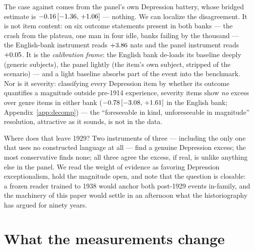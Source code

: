\documentclass[11pt]{article}
\begin{document}
The case against comes from the panel's own Depression battery, whose bridged estimate is $-0.16\,[-1.36,\,+1.06]$ ---
nothing. We can localize the disagreement. It is not item content: on six outcome statements present in both
banks --- the crash from the plateau, one man in four idle, banks failing by the thousand --- the English-bank
instrument reads $+3.86$ nats and the panel instrument reads $+0.05$. It is the
\emph{calibration frame}: the English bank de-loads its baseline deeply (generic subjects), the panel lightly
(the item's own subject, stripped of the scenario) --- and a light baseline absorbs part of the event into
the benchmark. Nor is it severity: classifying every Depression item by whether its outcome quantifies a
magnitude outside pre-1914 experience, severity items show \emph{no} excess over genre items in either bank
($-0.78\,[-3.08,\,+1.61]$ in the English bank; Appendix~\ref{app:decomp}) --- the ``foreseeable in kind,
unforeseeable in magnitude'' resolution, attractive as it sounds, is not in the data.

Where does that leave 1929? Two instruments of three --- including the only one that uses no constructed
language at all --- find a genuine Depression excess; the most conservative finds none; all three agree the
excess, if real, is unlike anything else in the panel. We read the weight of evidence as favoring Depression
exceptionalism, hold the magnitude open, and note that the question is closable: a frozen reader trained to
1938 would anchor both post-1929 events in-family, and the machinery of this paper would settle in an
afternoon what the historiography has argued for ninety years.

\section{What the measurements change}\label{sec:implications}
\end{document}
